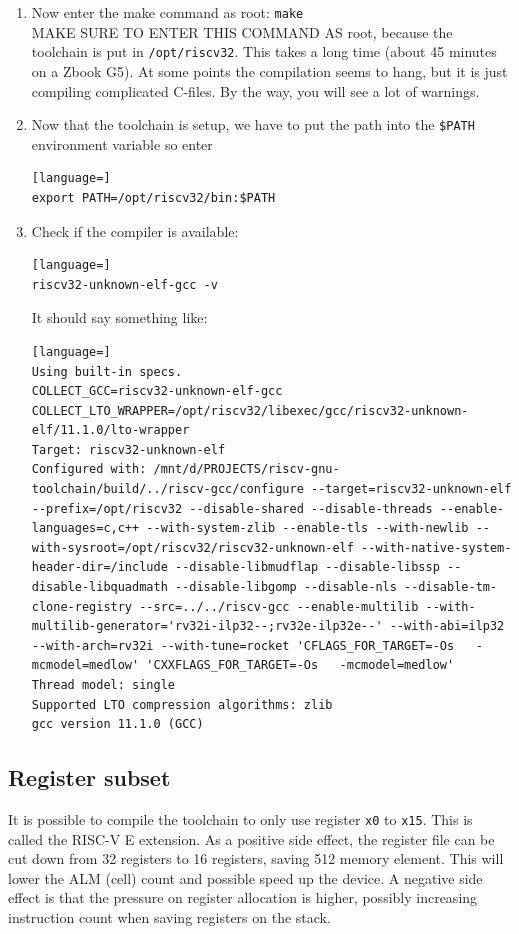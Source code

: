 \documentclass[12pt]{article}
\begin{document}
\begin{enumerate}
\item Now enter the make command as root: \lstinline|make|\\
MAKE SURE TO ENTER THIS COMMAND AS root, because the toolchain is put in \lstinline|/opt/riscv32|. This takes a long time (about 45 minutes on a Zbook G5). At some points the compilation seems to hang, but it is just compiling complicated C-files. By the way, you will see a lot of warnings.
\item Now that the toolchain is setup, we have to put the path into the \lstinline|$PATH| environment variable so enter
\begin{lstlisting}[language=]
export PATH=/opt/riscv32/bin:$PATH
\end{lstlisting}
\item Check if the compiler is available:
\begin{lstlisting}[language=]
riscv32-unknown-elf-gcc -v
\end{lstlisting}
It should say something like:
\begin{lstlisting}[language=]
Using built-in specs.
COLLECT_GCC=riscv32-unknown-elf-gcc
COLLECT_LTO_WRAPPER=/opt/riscv32/libexec/gcc/riscv32-unknown-elf/11.1.0/lto-wrapper
Target: riscv32-unknown-elf
Configured with: /mnt/d/PROJECTS/riscv-gnu-toolchain/build/../riscv-gcc/configure --target=riscv32-unknown-elf --prefix=/opt/riscv32 --disable-shared --disable-threads --enable-languages=c,c++ --with-system-zlib --enable-tls --with-newlib --with-sysroot=/opt/riscv32/riscv32-unknown-elf --with-native-system-header-dir=/include --disable-libmudflap --disable-libssp --disable-libquadmath --disable-libgomp --disable-nls --disable-tm-clone-registry --src=../../riscv-gcc --enable-multilib --with-multilib-generator='rv32i-ilp32--;rv32e-ilp32e--' --with-abi=ilp32 --with-arch=rv32i --with-tune=rocket 'CFLAGS_FOR_TARGET=-Os   -mcmodel=medlow' 'CXXFLAGS_FOR_TARGET=-Os   -mcmodel=medlow'
Thread model: single
Supported LTO compression algorithms: zlib
gcc version 11.1.0 (GCC) 
\end{lstlisting}
\end{enumerate}

\subsection{Register subset}
It is possible to compile the toolchain to only use register \texttt{x0} to \texttt{x15}. This is called the RISC-V E extension. As a positive side effect, the register file can be cut down from 32 registers to 16 registers, saving 512 memory element. This will lower the ALM (cell) count and possible speed up the device. A negative side effect is that the pressure on register allocation is higher, possibly increasing instruction count when saving registers on the stack.
\end{document}
